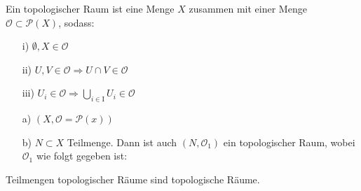 \begin{defs}
Ein topologischer Raum ist eine Menge $X$ zusammen mit einer Menge $\mathcal{O} \subset \mathcal{P}(X)$, sodass:
\begin{enumerate}
	\item[i)] $\emptyset, X \in \mathcal{O}$
	\item[ii)] $U, V \in \mathcal{O} \Rightarrow  U \cap V \in \mathcal{O}$
	\item [iii)] $U_i \in \mathcal{O} \Rightarrow\bigcup\limits_{i \in \text{I}} U_i \in \mathcal{O}$
\end{enumerate} 
\end{defs}
\begin{bsp}
\begin{enumerate}
	\item[a)] $( X, \mathcal{O} = \mathcal{P}(x) )$
	\item[b)] $N \subset X$ Teilmenge. Dann ist auch $(N,\mathcal{O}_1)$ ein topologischer Raum, wobei $\mathcal{O}_1$ wie folgt gegeben ist:\\
\end{enumerate}
Teilmengen topologischer Räume sind topologische Räume.
\end{bsp}

